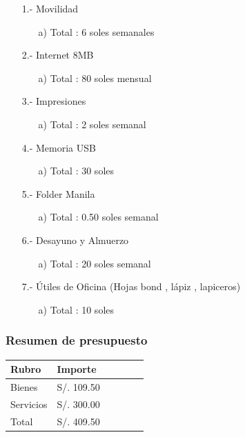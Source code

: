 \documentclass[a4paper, 12pt]{article}
\begin{document}
\begin{enumerate}

\item[1.-]Movilidad
\begin{enumerate}
\item[a)] Total : 6 soles semanales
\vskip 0.3cm
\end{enumerate}

\item[2.-]Internet 8MB
\begin{enumerate}
\item[a)] Total : 80 soles mensual
\vskip 0.3cm
\end{enumerate}

\item[3.-]Impresiones
\begin{enumerate}
\item[a)] Total : 2 soles semanal
\vskip 0.3cm
\end{enumerate}

\item[4.-]Memoria USB
\begin{enumerate}
\item[a)] Total : 30 soles 
\vskip 0.3cm
\end{enumerate}

\item[5.-]Folder Manila
\begin{enumerate}
\item[a)] Total : 0.50 soles semanal 
\vskip 0.3cm
\end{enumerate}

\item[6.-]Desayuno y Almuerzo
\begin{enumerate}
\item[a)] Total : 20 soles semanal 
\vskip 0.3cm
\end{enumerate}

\item[7.-]Útiles de Oficina (Hojas bond , lápiz , lapiceros)
\begin{enumerate}
\item[a)] Total : 10 soles
\vskip 0.3cm
\end{enumerate}

\end{enumerate}

\subsubsection{Resumen de presupuesto}
\begin{center}
\begin{table}[h!]
\centering
\begin{tabular}{llrrrr} \toprule
Rubro & Importe \\ \midrule
Bienes & S/. 109.50      \\
Servicios & S/. 300.00           \\ \bottomrule
Total & S/. 409.50
\end{tabular}
\end{table}
\end{center}
\end{document}
